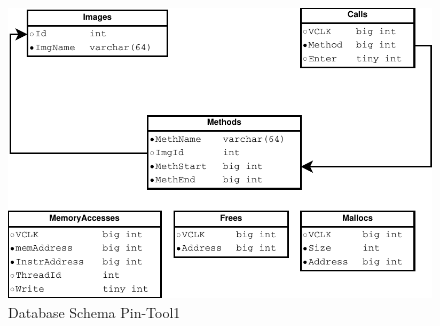 \begin{figure}
  \includegraphics[width=\columnwidth]{database_schema1}
  \caption{Database Schema Pin-Tool1}
  \label{pic:db_schema1}
\end{figure}


